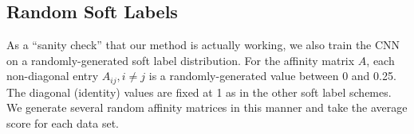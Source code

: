 \subsection{Random Soft Labels}

As a ``sanity check'' that our method is actually working, we also train the
CNN on a randomly-generated soft label distribution. For the affinity matrix
$A$, each non-diagonal entry $A_{ij}, i \neq j$ is a randomly-generated value
between 0 and 0.25. The diagonal (identity) values are fixed at 1 as in the
other soft label schemes. We generate several random affinity matrices in this
manner and take the average score for each data set.

%

